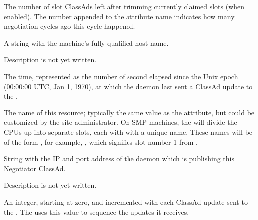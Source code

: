\begin{description}
\label{attr:LastNegotiationCycleTrimmedSlots<X>}
\item[\AdAttr{LastNegotiationCycleTrimmedSlots<X>}:] 
The number of slot ClassAds left after trimming currently claimed slots 
(when enabled).
The number  appended to the attribute name indicates 
how many negotiation cycles ago this cycle happened.

\item[\AdAttr{Machine}:] A string with the machine's fully qualified 
host name.

\item[\AdAttr{MyAddress}:] Description is not yet written.

\item[\AdAttr{MyCurrentTime}:]  The time, represented as the number of 
second elapsed since the Unix epoch (00:00:00 UTC, Jan 1, 1970),
at which the  daemon last sent a ClassAd update to the
.

\item[\AdAttr{Name}:] The name of this resource; typically the same value as
the  attribute, but could be customized by the site
administrator.
On SMP machines, the  will divide the CPUs up into separate
slots, each with with a unique name.
These names will be of the form , for example,
, which signifies slot number 1 from
.

\item[\AdAttr{NegotiatorIpAddr}:] String with the IP and port address of the
 daemon which is publishing this Negotiator ClassAd.

\item[\AdAttr{PublicNetworkIpAddr}:] Description is not yet written.

\item[\AdAttr{UpdateSequenceNumber}:] An integer, starting at zero,
and incremented with each ClassAd update sent to the .
The  uses this value to sequence the updates it
receives.

\end{description}

